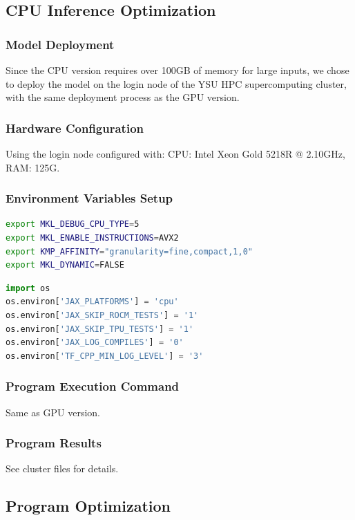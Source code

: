 \documentclass[a4paper,12pt]{article}
\begin{document}
\subsection{CPU Inference Optimization}

\subsubsection{Model Deployment}
Since the CPU version requires over 100GB of memory for large inputs, we chose to deploy the model on the login node of the YSU HPC supercomputing cluster, with the same deployment process as the GPU version.

\subsubsection{Hardware Configuration}
Using the login node configured with: CPU: Intel Xeon Gold 5218R @ 2.10GHz, RAM: 125G.

\subsubsection{Environment Variables Setup}
\begin{lstlisting}[language=bash]
export MKL_DEBUG_CPU_TYPE=5
export MKL_ENABLE_INSTRUCTIONS=AVX2
export KMP_AFFINITY="granularity=fine,compact,1,0"
export MKL_DYNAMIC=FALSE
\end{lstlisting}
\begin{lstlisting}[language=python]
import os
os.environ['JAX_PLATFORMS'] = 'cpu'      	
os.environ['JAX_SKIP_ROCM_TESTS'] = '1'   	
os.environ['JAX_SKIP_TPU_TESTS'] = '1'  		
os.environ['JAX_LOG_COMPILES'] = '0'  		
os.environ['TF_CPP_MIN_LOG_LEVEL'] = '3'
\end{lstlisting}

\subsubsection{Program Execution Command}
Same as GPU version.

\subsubsection{Program Results}
See cluster files for details.

\subsection{Program Optimization}
\end{document}
